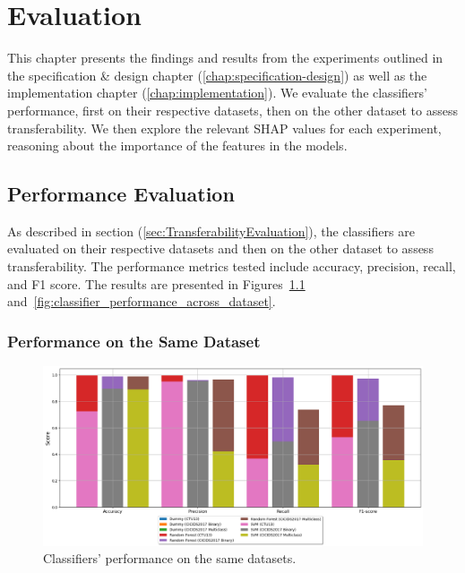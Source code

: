 \chapter{Evaluation}\label{chap:evaluation}

This chapter presents the findings and results from the experiments outlined in the specification \& design chapter (\ref{chap:specification-design}) as well as the implementation chapter (\ref{chap:implementation}). We evaluate the classifiers' performance, first on their respective datasets, then on the other dataset to assess transferability. We then explore the relevant SHAP values for each experiment, reasoning about the importance of the features in the models.

\section{Performance Evaluation}\label{sec:performance-evaluation}

As described in section (\ref{sec:TransferabilityEvaluation}), the classifiers are evaluated on their respective datasets and then on the other dataset to assess transferability. The performance metrics tested include accuracy, precision, recall, and F1 score. The results are presented in Figures~\ref{fig:classifier_performance_same_dataset} and~\ref{fig:classifier_performance_across_dataset}.

\subsection{Performance on the Same Dataset}\label{subsec:performance-same-dataset}

\begin{figure}[H]
\centering
\includegraphics[width=\textwidth]{img/Classifier_Performance_Same_Dataset.png}
\caption{Classifiers' performance on the same datasets.}\label{fig:classifier_performance_same_dataset}
\end{figure}

